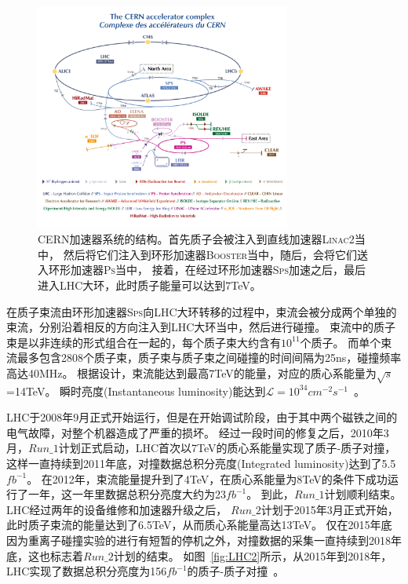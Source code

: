 \begin{figure}
  \begin{center}
    \includegraphics[width=0.75\textwidth]{figuresEXP/LHC1.png}
  \end{center}
  \caption{
CERN加速器系统的结构。首先质子会被注入到直线加速器\textsc{Linac2}当中，
然后将它们注入到环形加速器\textsc{Booster}当中，随后，会将它们送入环形加速器\textsc{Ps}当中，
接着，在经过环形加速器\textsc{Sps}加速之后，最后进入LHC大环，此时质子能量可以达到7TeV。
  }
    \label{fig:LHC1}
\end{figure}


在质子束流由环形加速器\textsc{Sps}向LHC大环转移的过程中，束流会被分成两个单独的束流，分别沿着相反的方向注入到LHC大环当中，然后进行碰撞。
束流中的质子束是以非连续的形式组合在一起的，每个质子束大约含有$10^{11}$个质子。
而单个束流最多包含2808个质子束，质子束与质子束之间碰撞的时间间隔为25ns，碰撞频率高达40MHz。
根据设计，束流能达到最高7TeV的能量，对应的质心系能量为$\sqrt{s}$=14TeV。
瞬时亮度(Instantaneous luminosity)能达到$\mathcal{L}=10^34 cm^{-2}s^{-1}$~\cite{Evans:2008zzb}。

LHC于2008年9月正式开始运行，但是在开始调试阶段，由于其中两个磁铁之间的电气故障，对整个机器造成了严重的损坏。
经过一段时间的修复之后，2010年3月，$Run\_1$计划正式启动，LHC首次以7TeV的质心系能量实现了质子-质子对撞，
这样一直持续到2011年底，对撞数据总积分亮度(Integrated luminosity)达到了5.5$fb^{-1}$。
在2012年，束流能量提升到了4TeV，在质心系能量为8TeV的条件下成功运行了一年，这一年里数据总积分亮度大约为23$fb^{-1}$。
到此，$Run\_1$计划顺利结束。
LHC经过两年的设备维修和加速器升级之后，
$Run\_2$计划于2015年3月正式开始，此时质子束流的能量达到了6.5TeV，从而质心系能量高达13TeV。
仅在2015年底因为重离子碰撞实验的进行有短暂的停机之外，对撞数据的采集一直持续到2018年底，这也标志着$Run\_2$计划的结束。
如图~\ref{fig:LHC2}所示，从2015年到2018年，LHC实现了数据总积分亮度为156$fb^{-1}$的质子-质子对撞~\cite{ATLASWEB1}。

